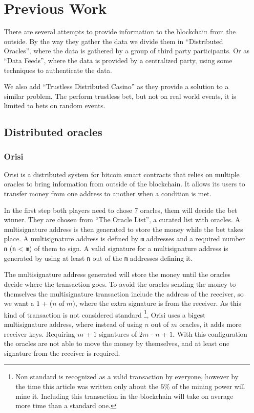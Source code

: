 \section{Previous Work} \label{sec:previous_work}

There are several attempts to provide information to the blockchain from the
  outside.
By the way they gather the data we divide them in ``Distributed Oracles'', where
  the data is gathered by a group of third party participants.
Or as ``Data Feeds'', where the data is provided by a centralized party, using
  some techniques to authenticate the data.

We also add ``Trustless Distributed Casino'' as they provide a solution to a
  similar problem.
The perform trustless bet, but not  on real world events, it is limited to
  bets on random events.

\subsection{Distributed oracles}
\subsubsection{Orisi}
Orisi \cite{orisiwhitepaper} is a distributed system for bitcoin smart
  contracts that relies on multiple oracles to bring information from outside
  of the blockchain.
It allows its users to transfer money from one address to another when a
  condition is met.

In the first step both players need to chose 7 oracles, them will decide the
  bet winner.
They are chosen from ``The Oracle List'', a curated list with oracles.
A multisignature address is then generated to store the money while the bet
  takes place.
A multisignature address is defined by \texttt{m} addresses and a required
  number \texttt{n} (\texttt{n} < \texttt{m}) of them to sign. A valid
  signature for a multisignature address is generated by using at least
  \texttt{n} out of the \texttt{m} addresses defining it.

The multisignature address generated will store the money until the oracles
  decide where the transaction goes. To avoid the oracles sending the money
  to themselves the multisignature transaction include the address of the
  receiver, so we want a $1$ + ($n$ of $m$), where the extra signature is
  from the receiver. As this kind of transaction is not considered standard
  \footnote{Non standard is recognized as a valid transaction by everyone,
  however by the time this article was written only about the $5\%$ of the
  mining power will mine it. Including this transaction in the blockchain will
  take on average more time than a standard one.},
  Orisi uses a bigest multisignature address, where instead of using
  $n$ out of $m$ oracles, it adds more receiver keys. Requiring $m$ + $1$
  signatures of $2m$ - $n$ + $1$. With this configuration the oracles are
  not able to move the money by themselves, and at least one signature
  from the receiver is required.

